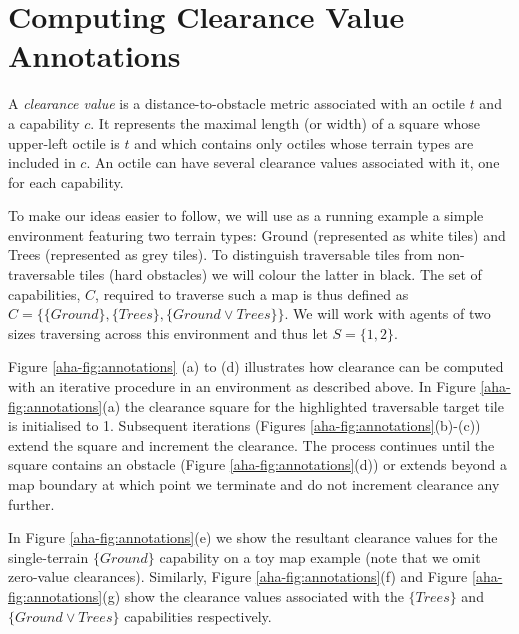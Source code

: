 \section{Computing Clearance Value Annotations}
\label{aha:computingclearance}
A \emph{clearance value} is a distance-to-obstacle metric associated with an octile $t$ and a capability $c$.
It represents the maximal length (or width) of a square whose upper-left octile is $t$ and which contains only octiles whose terrain types are included in $c$.
An octile can have several clearance values associated with it, one for each capability. 

To make our ideas easier to follow, we will use as a running example a simple environment featuring two terrain types: Ground (represented as white tiles) and Trees (represented as grey tiles). 
To distinguish traversable tiles from non-traversable tiles (hard obstacles) we will colour the latter in black. 
The set of capabilities, $C$, required to traverse such a map is thus defined as $C = \lbrace \lbrace \textit{Ground} \rbrace, \lbrace \textit{Trees} \rbrace, \lbrace \textit{Ground} \vee \textit{Trees} \rbrace \rbrace$. 
We will work with agents of two sizes traversing across this environment and thus let $S = \lbrace 1, 2 \rbrace$.
\par \indent
Figure \ref{aha-fig:annotations} (a) to (d) illustrates how clearance can be computed with an iterative procedure in an environment as described above.
In Figure \ref{aha-fig:annotations}(a) the clearance square for the highlighted traversable target tile is initialised to 1. 
Subsequent iterations (Figures \ref{aha-fig:annotations}(b)-(c)) extend the square and increment the clearance. 
The process continues until the square contains an obstacle (Figure \ref{aha-fig:annotations}(d)) or extends beyond a map boundary at which point we terminate and do not increment clearance any further.
\par \indent
In Figure \ref{aha-fig:annotations}(e) we show the resultant clearance values for the single-terrain $\lbrace \textit{Ground} \rbrace$ capability on a toy map example (note that we omit zero-value clearances).
Similarly, Figure \ref{aha-fig:annotations}(f) and Figure \ref{aha-fig:annotations}(g) show the clearance values associated with the $\lbrace \textit{Trees} \rbrace$ and $\lbrace \textit{Ground} \vee \textit{Trees} \rbrace$ capabilities respectively.  

